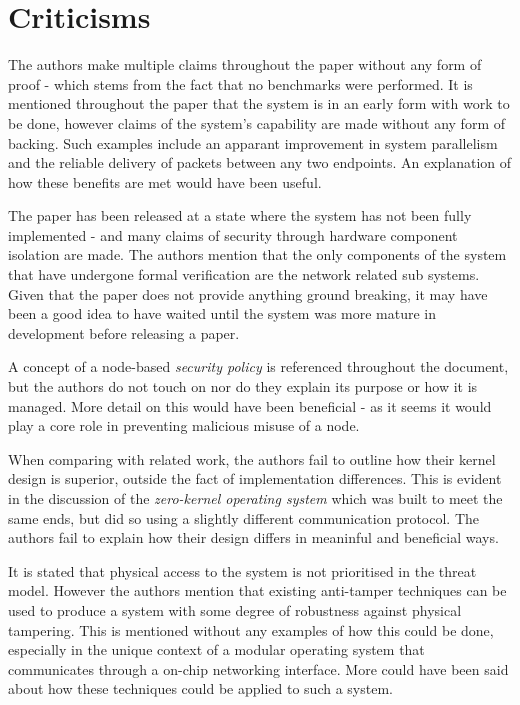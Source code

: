 \documentclass{article}
\begin{document}
\section*{Criticisms}
The authors make multiple claims throughout the paper without any form of proof - which stems from the fact that no benchmarks were performed. It is mentioned throughout the paper that the system is in an early form with work to be done, however claims of the system's capability are made without any form of backing.
Such examples include an apparant improvement in system parallelism and the reliable delivery of packets between any two endpoints. An explanation of how these benefits are met would have been useful.

The paper has been released at a state where the system has not been fully implemented - and many claims of security through hardware component isolation are made. The authors mention that the only components of the system that have undergone formal verification are the network related sub systems. Given that the paper does not provide anything ground breaking, it may have been a good idea to have waited until the system was more mature in development before releasing a paper.

A concept of a node-based \textit{security policy} is referenced throughout the document, but the authors do not touch on nor do they explain its purpose or how it is managed. More detail on this would have been beneficial - as it seems it would play a core role in preventing malicious misuse of a node.

When comparing with related work, the authors fail to outline how their kernel design is superior, outside the fact of implementation differences. This is evident in the discussion of the \textit{zero-kernel operating system} which was built to meet the same ends, but did so using a slightly different communication protocol. The authors fail to explain how their design differs in meaninful and beneficial ways.

It is stated that physical access to the system is not prioritised in the threat model. However the authors mention that existing anti-tamper techniques can be used to produce a system with some degree of robustness against physical tampering. This is mentioned without any examples of how this could be done, especially in the unique context of a modular operating system that communicates through a on-chip networking interface. More could have been said about how these techniques could be applied to such a system.


\nocite{*}


\end{document}
